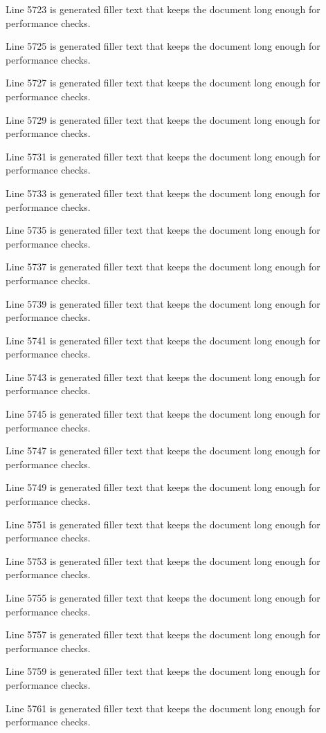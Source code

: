 Line 5723 is generated filler text that keeps the document long enough for performance checks.

Line 5725 is generated filler text that keeps the document long enough for performance checks.

Line 5727 is generated filler text that keeps the document long enough for performance checks.

Line 5729 is generated filler text that keeps the document long enough for performance checks.

Line 5731 is generated filler text that keeps the document long enough for performance checks.

Line 5733 is generated filler text that keeps the document long enough for performance checks.

Line 5735 is generated filler text that keeps the document long enough for performance checks.

Line 5737 is generated filler text that keeps the document long enough for performance checks.

Line 5739 is generated filler text that keeps the document long enough for performance checks.

Line 5741 is generated filler text that keeps the document long enough for performance checks.

Line 5743 is generated filler text that keeps the document long enough for performance checks.

Line 5745 is generated filler text that keeps the document long enough for performance checks.

Line 5747 is generated filler text that keeps the document long enough for performance checks.

Line 5749 is generated filler text that keeps the document long enough for performance checks.

Line 5751 is generated filler text that keeps the document long enough for performance checks.

Line 5753 is generated filler text that keeps the document long enough for performance checks.

Line 5755 is generated filler text that keeps the document long enough for performance checks.

Line 5757 is generated filler text that keeps the document long enough for performance checks.

Line 5759 is generated filler text that keeps the document long enough for performance checks.

Line 5761 is generated filler text that keeps the document long enough for performance checks.

